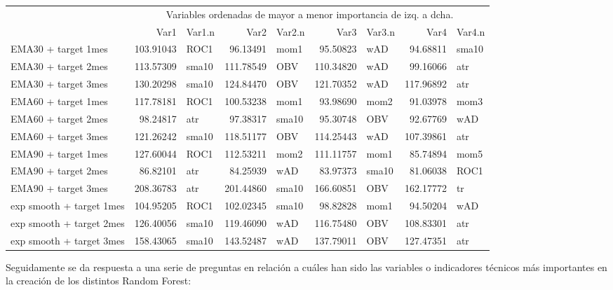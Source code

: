 \documentclass[]{DissertateUSU}
\begin{document}
\begin{table}[H]
\centering\begingroup\fontsize{10}{12}\selectfont

\begin{tabular}{l|r|l|r|l|r|l|r|l}
\hline
\multicolumn{1}{c|}{ } & \multicolumn{8}{c}{Variables ordenadas de mayor a menor importancia de izq. a dcha.} \\
\cline{2-9}
  & Var1 & Var1.n & Var2 & Var2.n & Var3 & Var3.n & Var4 & Var4.n\\
\hline
EMA30 + target 1mes & 103.91043 & ROC1 & 96.13491 & mom1 & 95.50823 & wAD & 94.68811 & sma10\\
\hline
EMA30 + target 2mes & 113.57309 & sma10 & 111.78549 & OBV & 110.34820 & wAD & 99.16066 & atr\\
\hline
EMA30 + target 3mes & 130.20298 & sma10 & 124.84470 & OBV & 121.70352 & wAD & 117.96892 & atr\\
\hline
EMA60 + target 1mes & 117.78181 & ROC1 & 100.53238 & mom1 & 93.98690 & mom2 & 91.03978 & mom3\\
\hline
EMA60 + target 2mes & 98.24817 & atr & 97.38317 & sma10 & 95.30748 & OBV & 92.67769 & wAD\\
\hline
EMA60 + target 3mes & 121.26242 & sma10 & 118.51177 & OBV & 114.25443 & wAD & 107.39861 & atr\\
\hline
EMA90 + target 1mes & 127.60044 & ROC1 & 112.53211 & mom2 & 111.11757 & mom1 & 85.74894 & mom5\\
\hline
EMA90 + target 2mes & 86.82101 & atr & 84.25939 & wAD & 83.97373 & sma10 & 81.06038 & ROC1\\
\hline
EMA90 + target 3mes & 208.36783 & atr & 201.44860 & sma10 & 166.60851 & OBV & 162.17772 & tr\\
\hline
exp smooth + target 1mes & 104.95205 & ROC1 & 102.02345 & sma10 & 98.82828 & mom1 & 94.50204 & wAD\\
\hline
exp smooth + target 2mes & 126.40056 & sma10 & 119.46090 & wAD & 116.75480 & OBV & 108.83301 & atr\\
\hline
exp smooth + target 3mes & 158.43065 & sma10 & 143.52487 & wAD & 137.79011 & OBV & 127.47351 & atr\\
\hline
\end{tabular}
\endgroup{}
\end{table}

\setlength\parskip{5ex}

Seguidamente se da respuesta a una serie de preguntas en relación a
cuáles han sido las variables o indicadores técnicos más importantes en
la creación de los distintos Random Forest:
\end{document}
